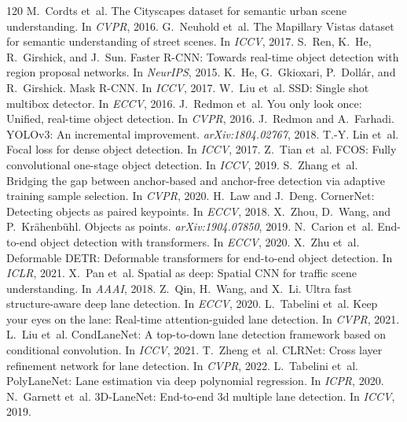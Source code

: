 \documentclass[10pt,twocolumn]{article}
\begin{document}
\begin{thebibliography}{120}
 M.~Cordts et~al. The Cityscapes dataset for semantic urban scene understanding. In \emph{CVPR}, 2016.
 G.~Neuhold et~al. The Mapillary Vistas dataset for semantic understanding of street scenes. In \emph{ICCV}, 2017.
 S.~Ren, K.~He, R.~Girshick, and J.~Sun. Faster R-CNN: Towards real-time object detection with region proposal networks. In \emph{NeurIPS}, 2015.
 K.~He, G.~Gkioxari, P.~Doll\'ar, and R.~Girshick. Mask R-CNN. In \emph{ICCV}, 2017.
 W.~Liu et~al. SSD: Single shot multibox detector. In \emph{ECCV}, 2016.
 J.~Redmon et~al. You only look once: Unified, real-time object detection. In \emph{CVPR}, 2016.
 J.~Redmon and A.~Farhadi. YOLOv3: An incremental improvement. \emph{arXiv:1804.02767}, 2018.
 T.-Y. Lin et~al. Focal loss for dense object detection. In \emph{ICCV}, 2017.
 Z.~Tian et~al. FCOS: Fully convolutional one-stage object detection. In \emph{ICCV}, 2019.
 S.~Zhang et~al. Bridging the gap between anchor-based and anchor-free detection via adaptive training sample selection. In \emph{CVPR}, 2020.
 H.~Law and J.~Deng. CornerNet: Detecting objects as paired keypoints. In \emph{ECCV}, 2018.
 X.~Zhou, D.~Wang, and P.~Kr\"ahenb\"uhl. Objects as points. \emph{arXiv:1904.07850}, 2019.
 N.~Carion et~al. End-to-end object detection with transformers. In \emph{ECCV}, 2020.
 X.~Zhu et~al. Deformable DETR: Deformable transformers for end-to-end object detection. In \emph{ICLR}, 2021.
 X.~Pan et~al. Spatial as deep: Spatial CNN for traffic scene understanding. In \emph{AAAI}, 2018.
 Z.~Qin, H.~Wang, and X.~Li. Ultra fast structure-aware deep lane detection. In \emph{ECCV}, 2020.
 L.~Tabelini et~al. Keep your eyes on the lane: Real-time attention-guided lane detection. In \emph{CVPR}, 2021.
 L.~Liu et~al. CondLaneNet: A top-to-down lane detection framework based on conditional convolution. In \emph{ICCV}, 2021.
 T.~Zheng et~al. CLRNet: Cross layer refinement network for lane detection. In \emph{CVPR}, 2022.
 L.~Tabelini et~al. PolyLaneNet: Lane estimation via deep polynomial regression. In \emph{ICPR}, 2020.
 N.~Garnett et~al. 3D-LaneNet: End-to-end 3d multiple lane detection. In \emph{ICCV}, 2019.

\end{thebibliography}
\end{document}
